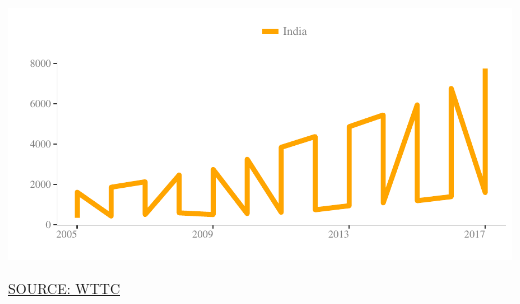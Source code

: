 \documentclass{article}\usepackage[]{graphicx}\usepackage[]{color}
\makeatletter
\def\maxwidth{ %
  \ifdim\Gin@nat@width>\linewidth
    \linewidth
  \else
    \Gin@nat@width
  \fi
}
\makeatother
\begin{document}
\begin{minipage}[t]{0.95\textwidth}
\begin{minipage}[b]{0.5\textwidth}
\hfill{}\includegraphics[width=\maxwidth]{figure/line1_2-1} 



     \hspace{4ex}\scriptsize{\href{NA}{\textcolor[HTML]{FF4023}{SOURCE: WTTC}}}
  \end{minipage}
\end{minipage}
\end{document}
